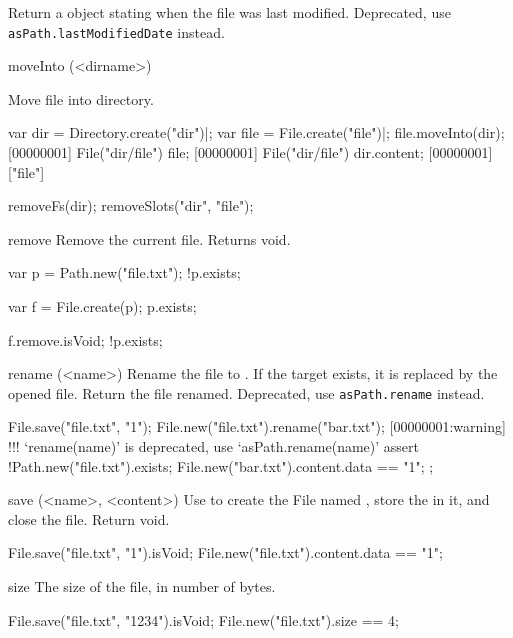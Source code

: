 \begin{urbiscriptapi}
  Return a  object stating when the file was last modified.
  Deprecated, use \lstinline|asPath.lastModifiedDate| instead.


\item[moveInto](<dirname>)
  \experimental{}

  Move file into  directory.
\begin{urbiscript}
var dir = Directory.create("dir")|;
var file = File.create("file")|;
file.moveInto(dir);
[00000001] File("dir/file")
file;
[00000001] File("dir/file")
dir.content;
[00000001] ["file"]
\end{urbiscript}
\begin{urbicomment}
removeFs(dir);
removeSlots("dir", "file");
\end{urbicomment}


\item[remove]%
  Remove the current file.  Returns void.
\begin{urbiassert}[firstnumber=1]
var p = Path.new("file.txt");
!p.exists;

var f = File.create(p);
p.exists;

f.remove.isVoid;
!p.exists;
\end{urbiassert}


\item[rename](<name>)%
  Rename the file to .  If the target exists, it is replaced by
  the opened file. Return the file renamed.
  Deprecated, use \lstinline|asPath.rename| instead.
\begin{urbiscript}
File.save("file.txt", "1\n");
File.new("file.txt").rename("bar.txt");
[00000001:warning] !!! `rename(name)' is deprecated, use `asPath.rename(name)'
assert
{
  !Path.new("file.txt").exists;
  File.new("bar.txt").content.data == "1\n";
};
\end{urbiscript}


\item[save](<name>, <content>)
  Use  to create the File named , store the
   in it, and close the file.  Return void.
\begin{urbiassert}
File.save("file.txt", "1\n").isVoid;
File.new("file.txt").content.data == "1\n";
\end{urbiassert}


\item[size]
  The size of the file, in number of bytes.
\begin{urbiassert}
File.save("file.txt", "1234").isVoid;
File.new("file.txt").size == 4;
\end{urbiassert}
\end{urbiscriptapi}


